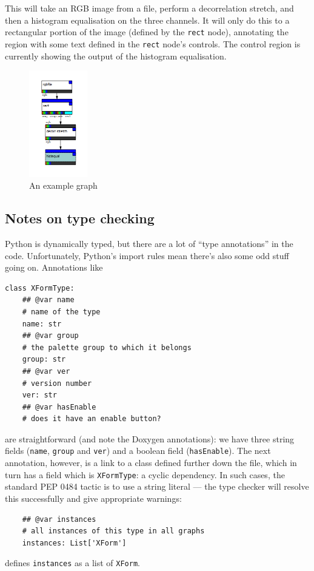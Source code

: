 \clearpage
This will take an RGB image from a file, perform a decorrelation stretch,
and then a histogram equalisation on the three channels. It will
only do this to a rectangular portion of the image (defined by the
\texttt{rect} node), annotating the region with some text defined in
the \texttt{rect} node's controls. The control region is currently
showing the output of the histogram equalisation.

\begin{figure}[ht]
\center
\includegraphics[width=1in]{graph.png}
\caption{An example graph}
\label{graph.png}
\end{figure}


\subsection{Notes on type checking}
Python is dynamically typed, but there are a lot of ``type annotations''
in the code. Unfortunately, Python's import rules mean there's also some
odd stuff going on. Annotations like
\begin{lstlisting}
class XFormType:
    ## @var name
    # name of the type
    name: str
    ## @var group
    # the palette group to which it belongs
    group: str
    ## @var ver
    # version number
    ver: str
    ## @var hasEnable
    # does it have an enable button?
\end{lstlisting}
are straightforward (and note the Doxygen annotations): we have three
string fields (\texttt{name}, \texttt{group} and \texttt{ver}) and
a boolean field (\texttt{hasEnable}). The next annotation, however,
is a link to a class defined further down the file, which in turn has
a field which is \texttt{XFormType}: a cyclic dependency. In such cases,
the standard PEP 0484 tactic is to use a string literal --- the type
checker will resolve this successfully and give appropriate warnings:
\begin{lstlisting}
    ## @var instances
    # all instances of this type in all graphs
    instances: List['XForm']
\end{lstlisting}
defines \texttt{instances} as a list of \texttt{XForm}.


